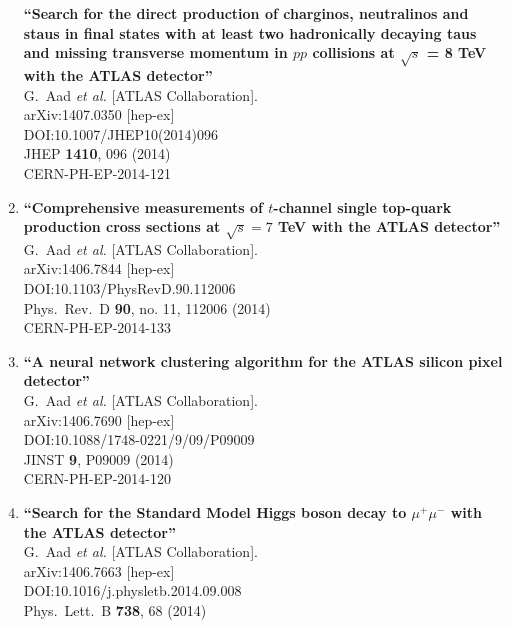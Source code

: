 \documentclass{article}
\begin{document}
\begin{enumerate}
{\bf ``Search for the direct production of charginos, neutralinos and staus in final states with at least two hadronically decaying taus and missing transverse momentum in $pp$ collisions at $\sqrt{s}$ = 8 TeV with the ATLAS detector''}
  \\{}G.~Aad {\it et al.} [ATLAS Collaboration].
  \\{}arXiv:1407.0350 [hep-ex]
  \\{}DOI:10.1007/JHEP10(2014)096
  \\{}JHEP {\bf 1410}, 096 (2014)
  \\{}CERN-PH-EP-2014-121
\item%
{\bf ``Comprehensive measurements of $t$-channel single top-quark production cross sections at $\sqrt{s} = 7$ TeV with the ATLAS detector''}
  \\{}G.~Aad {\it et al.} [ATLAS Collaboration].
  \\{}arXiv:1406.7844 [hep-ex]
  \\{}DOI:10.1103/PhysRevD.90.112006
  \\{}Phys.\ Rev.\ D {\bf 90}, no. 11, 112006 (2014)
  \\{}CERN-PH-EP-2014-133
\item%
{\bf ``A neural network clustering algorithm for the ATLAS silicon pixel detector''}
  \\{}G.~Aad {\it et al.} [ATLAS Collaboration].
  \\{}arXiv:1406.7690 [hep-ex]
  \\{}DOI:10.1088/1748-0221/9/09/P09009
  \\{}JINST {\bf 9}, P09009 (2014)
  \\{}CERN-PH-EP-2014-120
\item%
{\bf ``Search for the Standard Model Higgs boson decay to $\mu^{+}\mu^{-}$ with the ATLAS detector''}
  \\{}G.~Aad {\it et al.} [ATLAS Collaboration].
  \\{}arXiv:1406.7663 [hep-ex]
  \\{}DOI:10.1016/j.physletb.2014.09.008
  \\{}Phys.\ Lett.\ B {\bf 738}, 68 (2014)

\end{enumerate}
\end{document}
